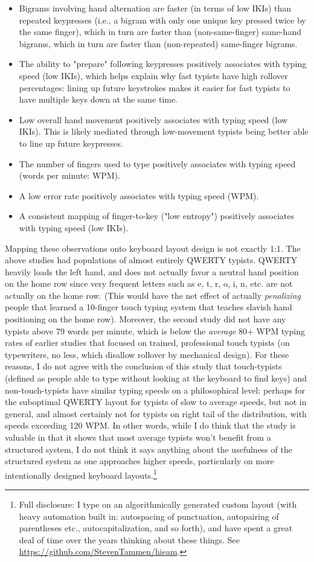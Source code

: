 \documentclass[11pt]{article}
\begin{document}
\begin{itemize}
\item Bigrams involving hand alternation are faster (in terms of low IKIs) than repeated keypresses (i.e., a bigram with only one unique key pressed twice by the same finger), which in turn are faster than (non-same-finger) same-hand bigrams, which in turn are faster than (non-repeated) same-finger bigrams.
\item The ability to "prepare" following keypresses positively associates with typing speed (low IKIs), which helps explain why fast typists have high rollover percentages: lining up future keystrokes makes it easier for fast typists to have multiple keys down at the same time.
\item Low overall hand movement positively associates with typing speed (low IKIs). This is likely mediated through low-movement typists being better able to line up future keypresses.
\item The number of fingers used to type positively associates with typing speed (words per minute: WPM).
\item A low error rate positively associates with typing speed (WPM).
\item A consistent mapping of finger-to-key ("low entropy") positively associates with typing speed (low IKIs).
\end{itemize}

Mapping these observations onto keyboard layout design is not exactly 1:1. The above studies had populations of almost entirely QWERTY typists. QWERTY heavily loads the left hand, and does not actually favor a neutral hand position on the home row since very frequent letters such as e, t, r, o, i, n, etc. are not actually on the home row. (This would have the net effect of actually \emph{penalizing} people that learned a 10-finger touch typing system that teaches slavish hand positioning on the home row). Moreover, the second study did not have any typists above 79 words per minute, which is below the \emph{average} 80+ WPM typing rates of earlier studies that focused on trained, professional touch typists (on typewriters, no less, which disallow rollover by mechanical design). For these reasons, I do not agree with the conclusion of this study that touch-typists (defined as people able to type without looking at the keyboard to find keys) and non-touch-typists have similar typing speeds on a philosophical level: perhaps for the suboptimal QWERTY layout for typists of slow to average speeds, but not in general, and almost certainly not for typists on right tail of the distribution, with speeds exceeding 120 WPM. In other words, while I do think that the study is valuable in that it shows that most average typists won't benefit from a structured system, I do not think it says anything about the usefulness of the structured system as one approaches higher speeds, particularly on more intentionally designed keyboard layouts.\footnote{Full disclosure: I type on an algorithmically generated custom layout (with heavy automation built in: autospacing of punctuation, autopairing of parentheses etc., autocapitalization, and so forth), and have spent a great deal of time over the years thinking about these things. See \url{https://github.com/StevenTammen/hieam}.}
\end{document}
